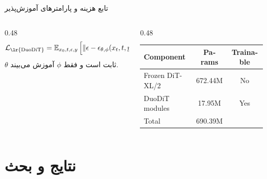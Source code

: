 \documentclass[aspectratio=169, 10pt]{beamer}
\begin{document}
\begin{frame}{تابع هزینه و پارامترهای آموزش‌پذیر}
    \begin{columns}[onlytextwidth]
        \begin{column}{0.48\textwidth}
            \[
            \mathcal{L}_{\text{\lr{DuoDiT}}}=
            \mathbb{E}_{x_0,t,\epsilon,y}
            \left[
            \left\|
            \epsilon-\epsilon_{\theta,\phi}(x_t,t,y)
            \right\|_2^2
            \right]
            \]
            \vspace{0.4em}
            {\small \(\theta\) ثابت است و فقط \(\phi\) آموزش می‌بیند.}
        \end{column}
        \begin{column}{0.48\textwidth}
            \small
            \begin{latin}
            \begin{tabular}{lcc}
                \toprule
                Component & Params & Trainable\\
                \midrule
                Frozen DiT-XL/2 & 672.44M & No\\
                DuoDiT modules & 17.95M & Yes\\
                \midrule
                Total & 690.39M & \\
                \bottomrule
            \end{tabular}
            \end{latin}
        \end{column}
    \end{columns}
\end{frame}

\section{نتایج و بحث}
\end{document}
